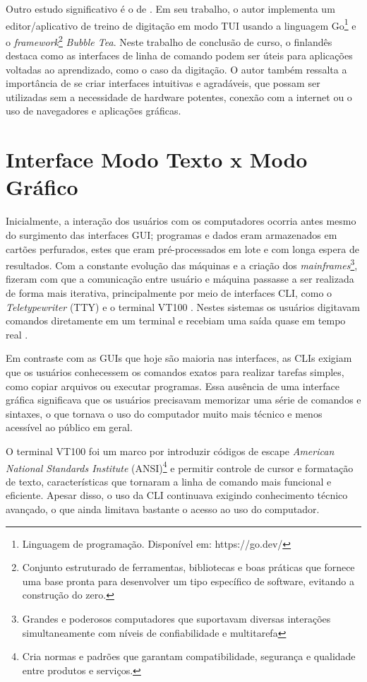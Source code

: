 Outro estudo significativo é o de . Em seu trabalho, o autor implementa um editor/aplicativo de treino de digitação em modo TUI usando a linguagem Go\footnote{Linguagem de programação. Disponível em: https://go.dev/} e o \textit{framework}\footnote{Conjunto estruturado de ferramentas, bibliotecas e boas práticas que fornece uma base pronta para desenvolver um tipo específico de software, evitando a construção do zero.} \textit{Bubble Tea}. Neste trabalho de conclusão de curso, o finlandês destaca como as interfaces de linha de comando podem ser úteis para aplicações voltadas ao aprendizado, como o caso da digitação. O autor também ressalta a importância de se criar interfaces intuitivas e agradáveis, que possam ser utilizadas sem a necessidade de hardware potentes, conexão com a internet ou o uso de navegadores e aplicações gráficas.

\section{Interface Modo Texto x Modo Gráfico}

Inicialmente, a interação dos usuários com os computadores ocorria antes mesmo do surgimento das interfaces GUI; programas e dados eram armazenados em cartões perfurados, estes que eram pré-processados em lote e com longa espera de resultados. Com a constante evolução das máquinas e a criação dos \textit{mainframes}\footnote{Grandes e poderosos computadores que suportavam diversas interações simultaneamente com níveis de confiabilidade e multitarefa}, fizeram com que a comunicação entre usuário e máquina passasse a ser realizada de forma mais iterativa, principalmente por meio de interfaces CLI, como o \textit{Teletypewriter} (TTY) \cite{ColumbiaTeletype2023} e o terminal VT100 \cite{DEC_VT100}. Nestes sistemas os usuários digitavam comandos diretamente em um terminal e recebiam uma saída quase em tempo real \cite{ComputerHistoryMuseum}.

Em contraste com as GUIs que hoje são maioria nas interfaces, as CLIs exigiam que os usuários conhecessem os comandos exatos para realizar tarefas simples, como copiar arquivos ou executar programas. Essa ausência de uma interface gráfica significava que os usuários precisavam memorizar uma série de comandos e sintaxes, o que tornava o uso do computador muito mais técnico e menos acessível ao público em geral.

O terminal VT100 foi um marco por introduzir códigos de escape \textit{American National Standards Institute} (ANSI)\footnote{Cria normas e padrões que garantam compatibilidade, segurança e qualidade entre produtos e serviços.} e permitir controle de cursor e formatação de texto, características que tornaram a linha de comando mais funcional e eficiente. Apesar disso, o uso da CLI continuava exigindo conhecimento técnico avançado, o que ainda limitava bastante o acesso ao uso do computador.

